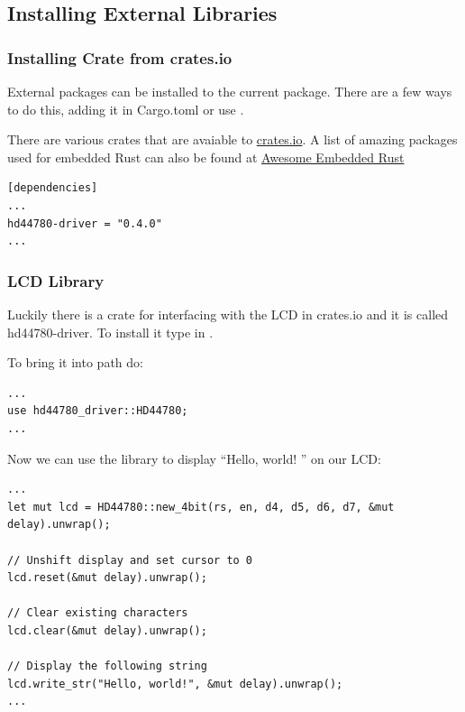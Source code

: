\documentclass{beamer}
\begin{document}
\subsection{Installing External Libraries}
\begin{frame}[fragile]
  \frametitle{Installing Crate from crates.io}
  External packages can be installed to the current package. There are a few ways to do this, adding it in Cargo.toml or use .

  There are various crates that are avaiable to \href{crates.io}{crates.io}. A list of amazing packages used for embedded Rust can also be found at \href{https://github.com/rust-embedded/awesome-embedded-rust}{Awesome Embedded Rust}

\begin{lstlisting}[caption={Adding Dependencies in Cargo.toml}]
[dependencies]
...
hd44780-driver = "0.4.0"
...
\end{lstlisting}
\end{frame}

\begin{frame}
  \frametitle{LCD Library}
  Luckily there is a crate for interfacing with the LCD in crates.io and it is called hd44780-driver. To install it type in .

  To bring it into path do:
\begin{lstlisting}[]
...
use hd44780_driver::HD44780;
...
\end{lstlisting}

  \pagebreak

  Now we can use the library to display ``Hello, world! '' on our LCD:\@

\begin{lstlisting}[]
...
let mut lcd = HD44780::new_4bit(rs, en, d4, d5, d6, d7, &mut delay).unwrap();

// Unshift display and set cursor to 0
lcd.reset(&mut delay).unwrap();

// Clear existing characters
lcd.clear(&mut delay).unwrap();

// Display the following string
lcd.write_str("Hello, world!", &mut delay).unwrap();
...
\end{lstlisting}
\end{frame}
\end{document}
